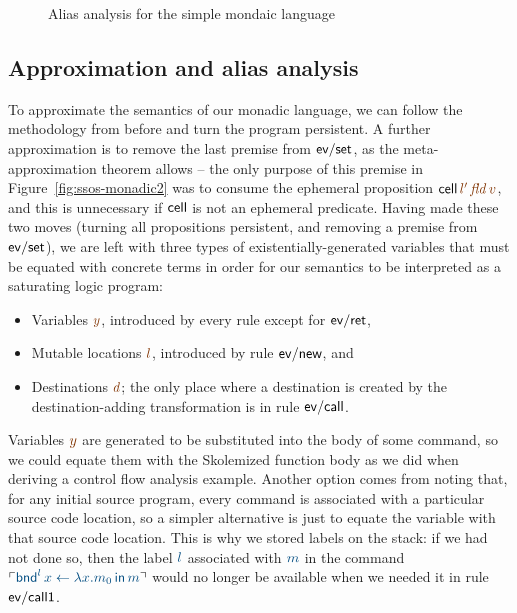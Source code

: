 \begin{figure}
\caption{Alias analysis for the simple mondaic language}
\label{fig:ssos-monadic-approx}
\end{figure}



\subsection{Approximation and alias analysis}


To approximate the semantics of our monadic language, we can follow the
methodology from before and turn the program persistent. A further
approximation is to remove the last premise from ${\sf ev/set}$, as
the meta-approximation theorem allows -- the only purpose of this
premise in Figure~\ref{fig:ssos-monadic2} was to consume the ephemeral
proposition ${\sf cell}\,\lf{l'}\,\lf{\it fld}\,\lf{v}$, and this is unnecessary
if ${\sf cell}$ is not an ephemeral predicate.  Having
made these two moves (turning all propositions persistent, and removing
a premise from ${\sf ev/set}$), we are left with three types of
existentially-generated variables that must be equated with concrete
terms in order for our semantics to be interpreted as a saturating
logic program:

\smallskip
\begin{itemize}
\item Variables $\lf{y}$, introduced by every rule except for ${\sf ev/ret}$,
\item Mutable locations $\lf{l}$, introduced by rule ${\sf ev/new}$, and 
\item Destinations $\lf{d}$; the only place where a destination is created
by the destination-adding transformation is in rule ${\sf ev/call}$.
\end{itemize}
\smallskip

Variables $\lf{y}$ are generated to be substituted into the body of some
command, so we could equate them with the Skolemized function body as
we did when deriving a control flow analysis example. Another option
comes from noting that, for any initial source program, every command
is associated with a particular source code location, so a simpler
alternative is just to equate the variable with that source code
location. This is why we stored labels on the stack: if we had not
done so, then the label $\obj{l}$ associated with $\obj{m}$ in the command
$\interp{{\sf bnd}^l\, x \leftarrow \lambda x.m_0 \,{\sf in}\,m}$ would
no longer be available when we needed it in rule ${\sf ev/call1}$.

